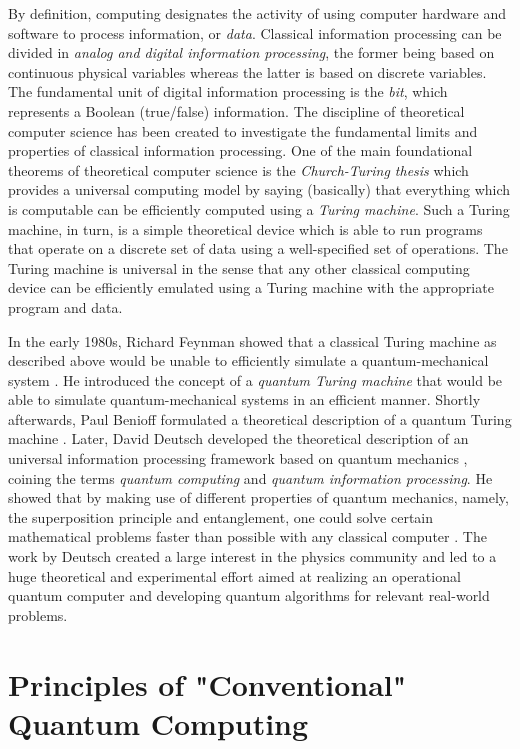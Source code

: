 By definition, computing designates the activity of using computer hardware and software to process information, or {\it data}. Classical information processing can be divided in {\it analog and digital information processing}, the former being based on continuous physical variables whereas the latter is based on discrete variables. The fundamental unit of digital information processing is the {\it bit}, which represents a Boolean (true/false) information. The discipline of theoretical computer science has been created to investigate the fundamental limits and properties of classical information processing. One of the main foundational theorems of theoretical computer science is the {\it Church-Turing thesis} which provides a universal computing model by saying (basically) that everything which is computable can be efficiently computed using a {\it Turing machine}. Such a Turing machine, in turn, is a simple theoretical device which is able to run programs that operate on a discrete set of data using a well-specified set of operations. The Turing machine is universal in the sense that any other classical computing device can be efficiently emulated using a Turing machine with the appropriate program and data.

\smallskip

In the early 1980s, Richard Feynman showed that a classical Turing machine as described above would be unable to efficiently simulate a quantum-mechanical system \citep{feynman_simulating_1982}. He introduced the concept of a {\it quantum Turing machine} that would be able to simulate quantum-mechanical systems in an efficient manner. Shortly afterwards, Paul Benioff formulated a theoretical description of a quantum Turing machine \citep{benioff_quantum_1982}. Later, David Deutsch developed the theoretical description of an universal information processing framework based on quantum mechanics \citep{deutsch_quantum_1985}, coining the terms {\it quantum computing} and {\it quantum information processing}. He showed that by making use of different properties of quantum mechanics, namely, the superposition principle and entanglement, one could solve certain mathematical problems faster than possible with any classical computer \citep{deutsch_quantum_1985}. The work by Deutsch created a large interest in the physics community and led to a huge theoretical and experimental effort aimed at realizing an operational quantum computer and developing quantum algorithms for relevant real-world problems.

\section{Principles of "Conventional" Quantum Computing}


